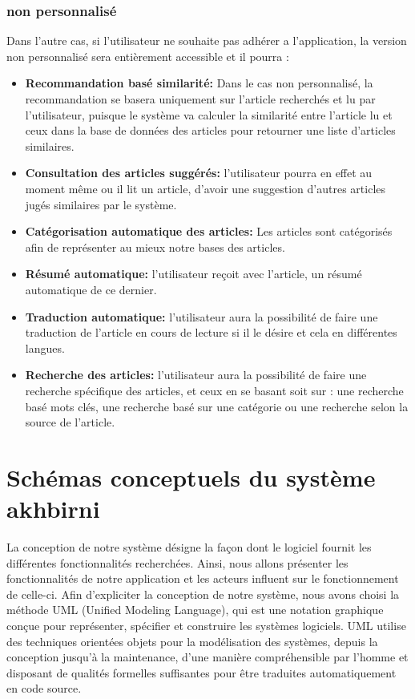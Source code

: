 \subsubsection{non personnalisé}
Dans l'autre cas, si l'utilisateur ne souhaite pas adhérer a l'application, la version non personnalisé sera entièrement accessible et il pourra :

\begin{itemize}
	
	\item \textbf{Recommandation basé similarité:}
	Dans le cas non personnalisé, la recommandation se basera uniquement sur l'article recherchés et lu par l'utilisateur, puisque le système va calculer la similarité entre l'article lu et ceux dans la base de données des articles pour retourner une liste d'articles similaires.
	
	\item \textbf{Consultation des articles suggérés:}
	l'utilisateur pourra en effet au moment même ou il lit un article, d'avoir une suggestion d'autres articles jugés similaires par le système.
	
	\item \textbf{Catégorisation automatique des articles:}
	Les articles sont catégorisés afin de représenter au mieux notre bases des articles.
	
	\item \textbf{Résumé automatique:}
	l'utilisateur reçoit avec l'article, un résumé automatique de ce dernier.
	
	\item \textbf{Traduction automatique:}
	l'utilisateur aura la possibilité de faire une traduction de l'article en cours de lecture si il le désire et cela en différentes langues.
	
	\item \textbf{Recherche des articles:}
     l'utilisateur aura la possibilité de faire une recherche spécifique des articles, et ceux en se basant soit sur : une recherche basé mots clés, une recherche basé sur une catégorie ou une recherche selon la source de l'article. 
	
	
\end{itemize}

\section{Schémas conceptuels du système akhbirni}

La conception de notre système désigne la façon dont le logiciel fournit les différentes fonctionnalités recherchées. Ainsi, nous allons présenter les fonctionnalités de notre application et les acteurs influent sur le fonctionnement de celle-ci. Afin d'expliciter la conception de notre système, nous avons choisi la méthode UML (Unified Modeling Language), qui est une notation graphique conçue pour représenter, spécifier et construire les systèmes logiciels. UML utilise des techniques orientées objets pour la modélisation des systèmes, depuis la conception jusqu'à la maintenance, d’une manière compréhensible par l’homme et disposant de qualités formelles suffisantes pour être traduites automatiquement en code source.\cite{uml}

